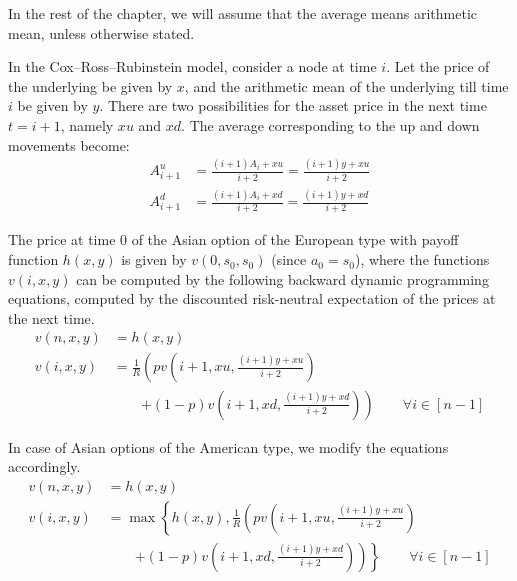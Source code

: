 In the rest of the chapter, we will assume that the average means arithmetic mean, unless otherwise stated.

In the Cox–Ross–Rubinstein model, consider a node at time $ i $. Let the price of the underlying be given by $ x $, and the arithmetic mean of the underlying till time $ i $ be given by $ y $. There are two possibilities for the asset price in the next time $ t = i + 1 $, namely $ x u $ and $ x d $. The average corresponding to the up and down movements become:
\begin{align*}
	A_{i+1}^u  &=  \frac{(i+1) A_i + x u}{i+2}  =  \frac{(i+1) y + x u}{i+2}  \\
	A_{i+1}^d  &=  \frac{(i+1) A_i + x d}{i+2}  =  \frac{(i+1) y + x d}{i+2}
\end{align*}

The price at time $ 0 $ of the Asian option of the European type with payoff function $ h(x, y) $ is given by $ v(0, s_0, s_0) $ (since $ a_0 = s_0 $), where the functions $ v(i, x, y) $ can be computed by the following backward dynamic programming equations, computed by the discounted risk-neutral expectation of the prices at the next time.
\begin{subequations}
	\label{eq:asian-dp-eu}
	\begin{align}
		v(n, x, y)  &=  h(x,y)  \\
		v(i, x, y)  &=  \frac{1}{R} \left(  p v \left( i + 1, x u, \frac{(i + 1) y + x u}{i + 2} \right)  \right.  \\
		&  \qquad  \left. + (1-p) v \left( i + 1, x d, \frac{(i + 1) y + x d}{i + 2} \right)  \right)  \qquad   \forall i \in [n - 1]  \nonumber
	\end{align}
\end{subequations}

In case of Asian options of the American type, we modify the equations accordingly.
\begin{subequations}
	\label{eq:asian-dp-am}
	\begin{align}
		v(n, x, y)  &=  h(x,y)  \\
		v(i, x, y)  &=  \max \left\lbrace  h(x, y), \frac{1}{R} \left(  p v \left( i + 1, x u, \frac{(i + 1) y + x u}{i + 2} \right)  \right. \right. \\
		&  \qquad  \left. \left. + (1-p) v \left( i + 1, x d, \frac{(i + 1) y + x d}{i + 2} \right)  \right)  \right\rbrace  \qquad  \forall i \in [n - 1]  \nonumber
	\end{align}
\end{subequations}

